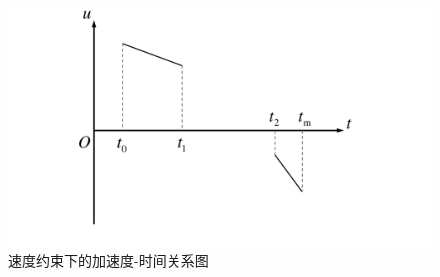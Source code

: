 \begin{figure}[htbp]
\centering
\includegraphics[width=12cm]{figures/vcu.pdf}
\caption{速度约束下的加速度-时间关系图}
\label{fig:vcu}
\end{figure}

